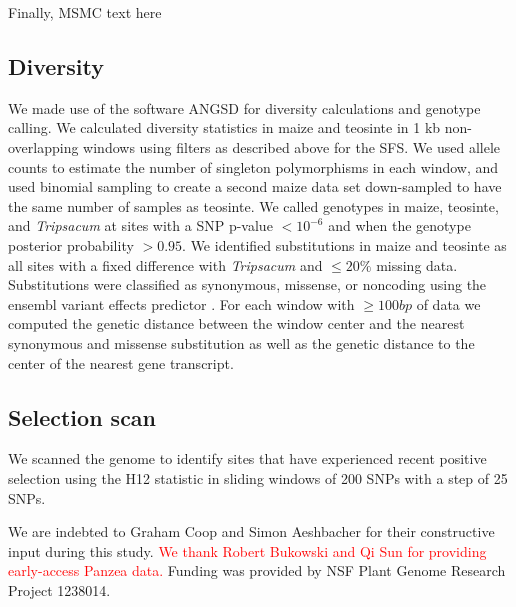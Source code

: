 \documentclass{pnastwo}
\begin{document}
\begin{article}
\begin{materials}
\color{blue}
Finally, MSMC text here
\color{black}

\subsection{Diversity}
We made use of the software ANGSD \cite{korneliussen2014} for diversity calculations and genotype calling. 
We calculated diversity statistics in maize and teosinte in 1 kb non-overlapping windows using filters as described above for the SFS. 
We used allele counts to estimate the number of singleton polymorphisms in each window, and used binomial sampling to create a second maize data set down-sampled to have the same number of samples as teosinte.
We called genotypes in maize, teosinte, and \emph{Tripsacum} at sites with a SNP p-value $<10^{-6}$ and when the genotype posterior probability $>0.95$.
We identified substitutions in maize and teosinte as all sites with a fixed difference with \emph{Tripsacum} and $\leq 20\%$ missing data. 
Substitutions were classified as synonymous, missense, or noncoding using the ensembl variant effects predictor \cite{mclaren2010}.
For each window with $\geq 100bp$ of data we computed the genetic distance between the window center and the nearest synonymous and missense substitution as well as the genetic distance to the center of the nearest gene transcript.  

\subsection{Selection scan}
We scanned the genome to identify sites that have experienced recent positive selection using the H12 statistic \cite{garud2015} in sliding windows of 200 SNPs with a step of 25 SNPs.


\end{materials}

\begin{acknowledgments}
We are indebted to Graham Coop and Simon Aeshbacher for their constructive input during this study. \textcolor{red}{We thank Robert Bukowski and Qi Sun for providing early-access Panzea data.} Funding was provided by NSF Plant Genome Research Project 1238014.
\end{acknowledgments}



\onecolumn
 


\end{article}
\end{document}
